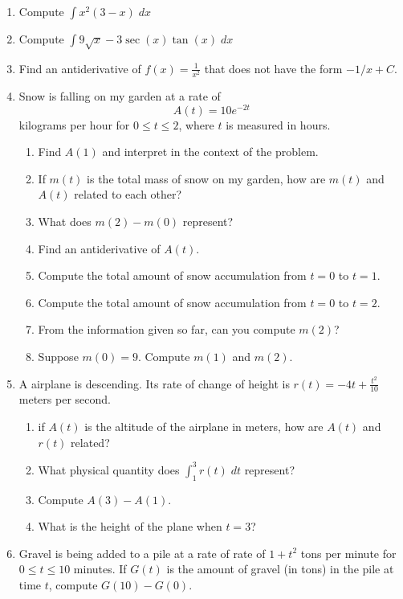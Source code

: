 \documentclass[11pt,fleqn]{article}
\newcommand{\be}{\begin{enumerate}}
\newcommand{\ee}{\end{enumerate}}
\begin{document}
\setlength{\parindent}{0cm}
\renewcommand{\headrulewidth}{0pt}
\newcommand{\blank}[1]{\rule{#1}{0.75pt}}
\renewcommand{\d}{\displaystyle}
\vspace*{-0.7in}
\begin{center}
  \Large {}
\end{center}

\be
\item Compute $\int x^2(3-x)\; dx$
\vfill

\item Compute $\int 9\sqrt{x} - 3 \sec(x)\tan(x)\; dx$
\vfill

\item Find an antiderivative of $f(x)=\frac{1}{x^2}$
that does not have the form $-1/x + C$.
\vfill



\item Snow is falling on my garden at a rate of
\[
A(t) = 10 e^{-2 t}
\]
kilograms per hour for $0\le t\le 2$, where $t$ is measured in hours.
\begin{enumerate}
\item Find $A(1)$ and interpret in the context of the problem.
\vfill
\item If $m(t)$ is the total mass of snow on my garden, how are $m(t)$
and $A(t)$ related to each other?
\vfill
\item What does $m(2)-m(0)$ represent?
\vfill
\item Find an antiderivative of $A(t)$.
\vfill
\item Compute the total amount of snow accumulation from $t=0$ to $t=1$.
\vfill
\item Compute the total amount of snow accumulation from $t=0$ to $t=2$.
\vfill
\newpage
\item From the information given so far, can you compute $m(2)$?
\vfill
\item Suppose $m(0)=9$.  Compute $m(1)$ and $m(2)$.
\vfill
\end{enumerate}

\item A airplane is descending.  Its rate of change of height
is $\d r(t) = -4 t + \frac{t^2}{10}$ meters per second.  
\begin{enumerate}
\item if $A(t)$ is the altitude of the airplane in meters, 
how are $A(t)$ and $r(t)$ related?
\vfill
\item What physical quantity
does $\d \int_1^3 r(t)\; dt$ represent?
\vfill
\item  Compute $A(3)-A(1)$.
\vfill
\item What is the height of the plane when $t=3$?
\vfill
\end{enumerate}
\vfill
\item
Gravel is being added to a pile at a rate of rate of $1+t^2$
tons per minute for $0\le t\le 10$ minutes. If $G(t)$ is the
amount of gravel (in tons) in the pile at time $t$, compute
$G(10)-G(0)$.
\vfill
\ee
\end{document}
